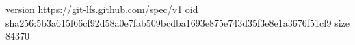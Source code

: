 version https://git-lfs.github.com/spec/v1
oid sha256:5b3a615f66cf92d58a0e7fab509bcdba1693e875e743d35f3e8e1a3676f51cf9
size 84370
